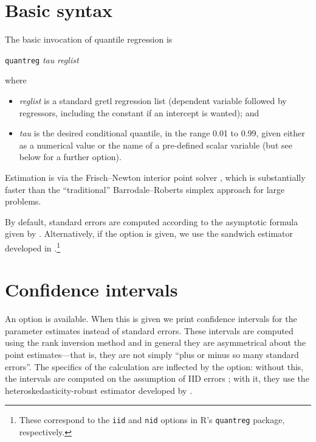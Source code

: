 \section{Basic syntax}

The basic invocation of quantile regression is

\vspace{1em}
\noindent
\qquad \texttt{quantreg} \textsl{tau} \textsl{reglist}
\vspace{1em}

where

\begin{itemize}
\item \textsl{reglist} is a standard \textsf{gretl} regression list
  (dependent variable followed by regressors, including the constant
  if an intercept is wanted); and
\item \textsl{tau} is the desired conditional quantile, in the range
  0.01 to 0.99, given either as a numerical value or the name of a
  pre-defined scalar variable (but see below for a further option).
\end{itemize}

Estimation is via the Frisch--Newton interior point solver
\citep{portnoy97}, which is substantially faster than the
``traditional'' Barrodale--Roberts \citeyearpar{barrodale74} simplex
approach for large problems.

By default, standard errors are computed according to the asymptotic
formula given by \cite{koenker-bassett78}.  Alternatively, if the
 option is given, we use the sandwich estimator
developed in \cite{koenker-zhao94}.\footnote{These correspond to the
  \texttt{iid} and \texttt{nid} options in \textsf{R}'s
  \texttt{quantreg} package, respectively.}

\section{Confidence intervals}

An option  is available.  When this is given we
print confidence intervals for the parameter estimates instead of
standard errors.  These intervals are computed using the rank
inversion method and in general they are asymmetrical about the point
estimates---that is, they are not simply ``plus or minus so many
standard errors''.  The specifics of the calculation are inflected by
the  option: without this, the intervals are computed
on the assumption of IID errors \citep{koenker94}; with it, they use
the heteroskedasticity-robust estimator developed by
\cite{koenker-machado99}.

